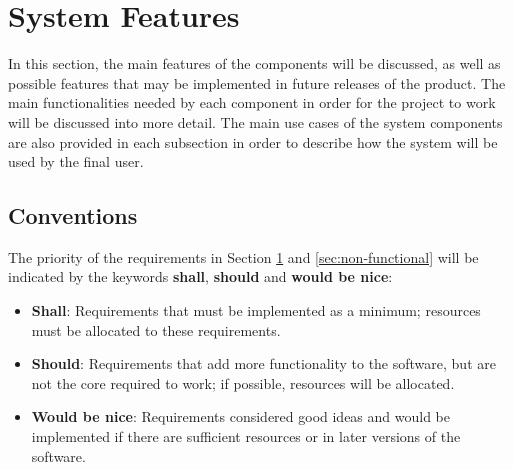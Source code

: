 \section{System Features}
\label{sec:system-features}

In this section, the main features of the components will be discussed, as well as possible features that may be implemented in future releases of the product.
The main functionalities needed by each component in order for the project to work will be discussed into more detail. \newline
The main use cases of the system components are also provided in each subsection in order to describe how the system will be used by the final user. 

\subsection{Conventions}

The priority of the requirements in Section \ref{sec:system-features} and \ref{sec:non-functional} will be indicated by the keywords \textbf{shall}, \textbf{should} and \textbf{would be nice}:

\begin{itemize}
	\item \textbf{Shall}: Requirements that must be implemented as a minimum; resources must be allocated to these requirements.
	\item \textbf{Should}: Requirements that add more functionality to the software, but are not the core required to work; if possible, resources will be allocated.
	\item \textbf{Would be nice}: Requirements considered good ideas and would be implemented if there are sufficient resources or in later versions of the software.
\end{itemize}






